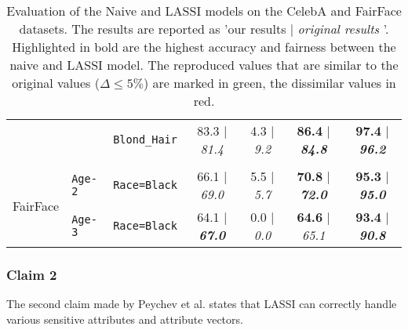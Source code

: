 \begin{table}[h]
{\begin{tabular}{lllcccc}
& & \texttt{Blond\_Hair} & \colorbox{mygreen}{83.3} | \textit{81.4} & \colorbox{mygreen}{4.3} | \textit{9.2} & \colorbox{mygreen}{\textbf{86.4}} | \textbf{\textit{84.8}} & \colorbox{mygreen}{\textbf{97.4}} | \textbf{\textit{96.2}} \\
\cmidrule(rl){1-3} \cmidrule(rl){4-5} \cmidrule(rl){6-7} \\
\cmidrule(rl){1-3} \cmidrule(rl){4-5} \cmidrule(rl){6-7}
\multirow{2}{*}{FairFace} & \texttt{Age-2} & \texttt{Race=Black} & \colorbox{mygreen}{66.1} | \textit{69.0} & \colorbox{mygreen}{5.5} | \textit{5.7} & \colorbox{mygreen}{\textbf{70.8}} | \textbf{\textit{72.0}} & \colorbox{mygreen}{\textbf{95.3}} | \textbf{\textit{95.0}} \\
& \texttt{Age-3} & \texttt{Race=Black} & \colorbox{mygreen}{64.1} | \textbf{\textit{67.0}} & \colorbox{mygreen}{0.0} | \textit{0.0} & \colorbox{mygreen}{\textbf{64.6}} | \textit{65.1} & \colorbox{mygreen}{\textbf{93.4}} | \textbf{\textit{90.8}} \\
\bottomrule
\end{tabular}}
\caption{\label{tab:main_results} Evaluation of the Naive and LASSI models on the CelebA and FairFace datasets. The results are reported as 'our results | \textit{original results \cite{peychev2022latent}}'. Highlighted in bold are the highest accuracy and fairness between the naive and LASSI model. The reproduced values that are similar to the original values ($\Delta \leq 5\%$) are marked in green, the dissimilar values in red.}
\end{table}




\subsubsection{Claim 2} The second claim made by Peychev et al. \cite{peychev2022latent} states that LASSI can correctly handle various sensitive attributes and attribute vectors. \newline

